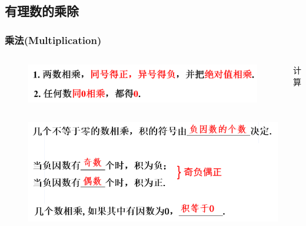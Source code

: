 \subsection{有理数的乘除}
\begin{frame}
    \frametitle{乘法(Multiplication)}
    \begin{columns}
        \begin{figure}
            \includegraphics[width=.9\textwidth]{assets/multiplication.png}
        \end{figure}
        \begin{block}{计算}
        \end{block}
    \end{columns}
    \begin{figure}
        \includegraphics[width=.69\textwidth]{assets/multiplication2.png}
    \end{figure}
    
\end{frame}

